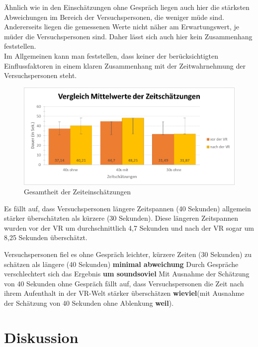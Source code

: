 \documentclass{Paper}
\begin{document}
Ähnlich wie in den Einschätzungen ohne Gespräch liegen auch hier die stärksten Abweichungen im Bereich der Versuchspersonen, die weniger müde sind. Andererseits liegen die gemessenen Werte nicht näher am Erwartungswert, je müder die Versuchspersonen sind. Daher lässt sich auch hier kein Zusammenhang feststellen.\\
Im Allgemeinen kann man feststellen, dass keiner der berücksichtigten Einflussfaktoren in einem klaren Zusammenhang mit der Zeitwahrnehmung der Versuchspersonen steht.




\begin{figure}[H]
	\centering
	\includegraphics[scale=0.7]{../Diagramme/zeitschaetzungen/vergleich.png}
	\caption{Gesamtheit der Zeiteinschätzungen}
	\label{zeiteinschaetzungen}
\end{figure}


Es fällt auf, dass Versuchspersonen längere Zeitspannen (40 Sekunden) allgemein stärker überschätzten als kürzere (30 Sekunden). Diese längeren Zeitspannen wurden vor der VR um durchschnittlich 4,7 Sekunden und nach der VR sogar um 8,25 Sekunden überschätzt.



Versuchspersonen fiel es ohne Gespräch leichter, kürzere Zeiten (30 Sekunden) zu schätzen als längere (40 Sekunden) \textbf{minimal abweichung} Durch Gespräche verschlechtert sich das Ergebnis \textbf{um soundsoviel}
Mit Ausnahme der Schätzung von 40 Sekunden ohne Gespräch fällt auf, dass Versuchspersonen die Zeit nach ihrem Aufenthalt in der VR-Welt stärker überschätzen \textbf{wieviel}(mit Ausnahme der Schätzung von 40 Sekunden ohne Ablenkung \textbf{weil}). 



       



\section{Diskussion}
\end{document}
